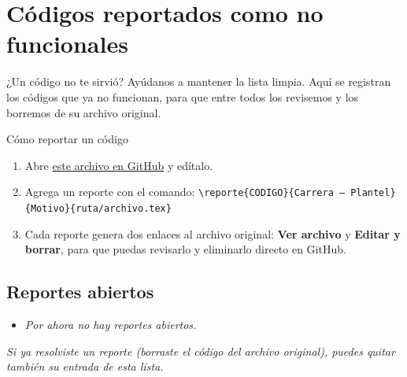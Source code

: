 \section{Códigos reportados como no funcionales}

¿Un código no te sirvió? Ayúdanos a mantener la lista limpia. Aquí se registran los códigos que ya no funcionan, para que entre todos los revisemos y los borremos de su archivo original.

\begin{myquote}{Cómo reportar un código}
\begin{enumerate}[leftmargin=*]
  \item Abre \href{\ghedit{reportes.tex}}{este archivo en GitHub} y edítalo.
  \item Agrega un reporte con el comando:
        \texttt{\textbackslash reporte\{CODIGO\}\{Carrera -- Plantel\}\{Motivo\}\{ruta/archivo.tex\}}
  \item Cada reporte genera dos enlaces al archivo original: \textbf{Ver archivo} y
        \textbf{Editar y borrar}, para que puedas revisarlo y eliminarlo directo en GitHub.
\end{enumerate}
\end{myquote}

\subsection*{Reportes abiertos}
\begin{itemize}[leftmargin=*]
  \item \textit{Por ahora no hay reportes abiertos.}
\end{itemize}

\noindent\textit{Si ya resolviste un reporte (borraste el código del archivo original), puedes quitar también su entrada de esta lista.}